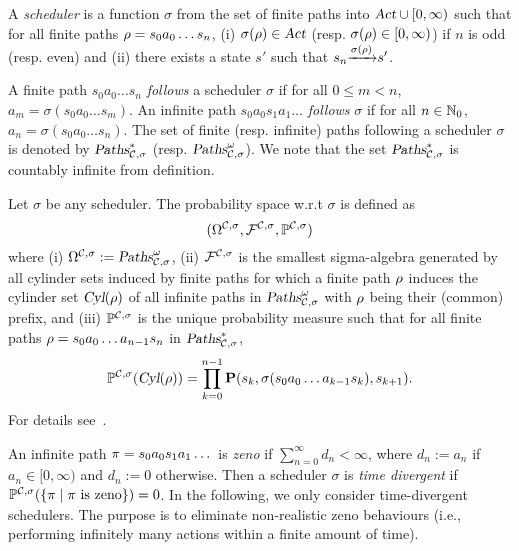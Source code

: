 \smallskip {}
A \emph{scheduler} is a function $\sigma$ from the set of finite paths into $\mbox{\sl Act}\cup [0,\infty)$ such that for all finite paths $\rho=s_0a_0\dots s_n$,
(i) $\sigma(\rho)\in\mbox{\sl Act}$ (resp. $\sigma(\rho)\in  [0,\infty)$) if $n$ is odd (resp. even) and (ii)
there exists a state $s'$ such that ${s_n}{\xrightarrow{\sigma(\rho)}}{s'}$.

\smallskip{}
A finite path $s_0a_0\dots s_n$ \emph{follows} a scheduler $\sigma$ if for all $0\le m< n$, $a_m=\sigma\left(s_0a_0\dots s_m\right)$.
An infinite path $s_0a_0s_1a_1\dots$ \emph{follows} $\sigma$ if for all $n\in\mathbb{N}_0$, $a_n=\sigma\left(s_0a_0\dots s_n\right)$.
The set of finite (resp. infinite) paths following a scheduler $\sigma$ is denoted by $\mbox{\sl Paths}^*_{\mathcal{C},\sigma}$ (resp. $\mbox{\sl Paths}^\omega_{\mathcal{C},\sigma}$).
We note that the set $\mbox{\sl Paths}^*_{\mathcal{C},\sigma}$ is countably infinite from definition.

\smallskip {}
Let $\sigma$ be any scheduler.
The probability space w.r.t $\sigma$ is defined as
\[
(\Omega^{\mathcal{C},\sigma}, \mathcal{F}^{\mathcal{C},\sigma}, \mathbb{P}^{\mathcal{C},\sigma})
\]
where (i) $\Omega^{\mathcal{C},\sigma}:=\mbox{\sl Paths}^\omega_{\mathcal{C},\sigma}$, (ii) $\mathcal{F}^{\mathcal{C},\sigma}$ is the smallest sigma-algebra generated by all cylinder sets induced by finite paths for which
a finite path $\rho$ induces the cylinder set $\mbox{\sl Cyl}(\rho)$ of all infinite paths in $\mbox{\sl Paths}^\omega_{\mathcal{C},\sigma}$ with $\rho$ being their (common) prefix,
and (iii) $\mathbb{P}^{\mathcal{C},\sigma}$ is the unique probability measure such that for all finite paths $\rho=s_0a_0\dots a_{n-1}s_n$ in $\mbox{\sl Paths}^*_{\mathcal{C},\sigma}$,
\[
\mathbb{P}^{\mathcal{C},\sigma}(\mbox{\sl Cyl}(\rho))=\prod_{k=0}^{n-1} \mathbf{P}(s_k, \sigma(s_0a_0\dots a_{k-1}s_k), s_{k+1}).
\]
For details see~\cite{DBLP:journals/tcs/KwiatkowskaNSS02}.

\smallskip {}
An infinite path $\pi=s_0a_0s_1a_1\dots$ is \emph{zeno} if $\sum_{n=0}^\infty d_n<\infty$, where $d_n:=a_n$ if $a_n\in [0,\infty)$ and $d_n:=0$ otherwise.
Then a scheduler $\sigma$ is \emph{time divergent} if $\mathbb{P}^{\mathcal{C},\sigma}(\{\pi\mid\pi\mbox{ is zeno}\})=0$.
In the following, we only consider time-divergent schedulers.
The purpose is to eliminate non-realistic zeno behaviours (i.e., performing infinitely many actions within a finite amount of time).

